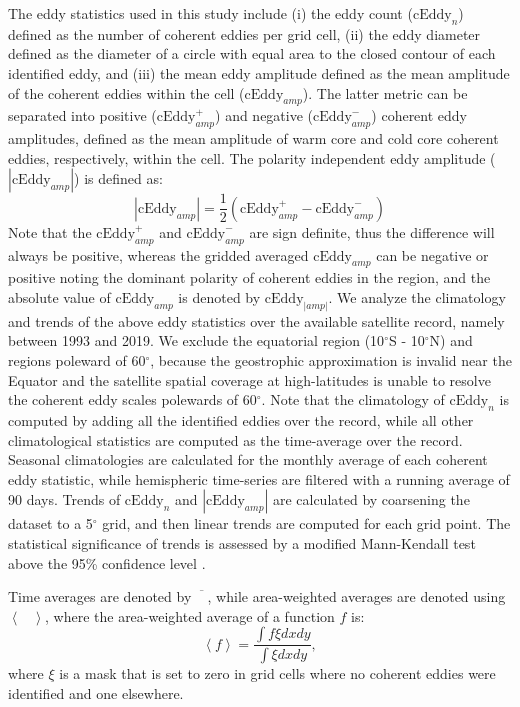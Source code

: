 \documentclass[draft,linenumbers]{agujournal2019}
\begin{document}
	The eddy statistics used in this study include (i) the eddy count ($\mathrm{cEddy}_{n}$) defined as the number of coherent eddies per grid cell, (ii) the eddy diameter defined as the diameter of a circle with equal area to the closed contour of each identified eddy, and (iii) the mean eddy amplitude defined as the mean amplitude of the coherent eddies within the cell ($\mathrm{cEddy}_{amp}$). The latter metric can be separated into positive ($\mathrm{cEddy}_{amp}^{+}$) and negative ($\mathrm{cEddy}_{amp}^{-}$) coherent eddy amplitudes, defined as the mean amplitude of warm core and cold core coherent eddies, respectively, within the cell. 
	The polarity independent eddy amplitude ($|\mathrm{cEddy}_{amp}|$) is defined as:
	\begin{equation}
	|\mathrm{cEddy}_{amp}| = \frac{1}{2} \left(\mathrm{cEddy}_{amp}^{+} -  \mathrm{cEddy}_{amp}^{-} \right)
	\end{equation}
	Note that the $\mathrm{cEddy}_{amp}^{+}$ and $\mathrm{cEddy}_{amp}^{-}$ are sign definite, thus the difference will always be positive, whereas the gridded averaged $\mathrm{cEddy}_{amp}$ can be negative or positive noting the dominant polarity of coherent eddies in the region, and the absolute value of $\mathrm{cEddy}_{amp}$ is denoted by $\mathrm{cEddy}_{|amp|}$.
	We analyze the climatology and trends of the above eddy statistics over the available satellite record, namely between 1993 and 2019. 
	We exclude the equatorial region (10$^\circ$S - 10$^\circ$N) and regions poleward of 60$^\circ$, because the geostrophic approximation is invalid near the Equator and the satellite spatial coverage at high-latitudes is unable to resolve the coherent eddy scales polewards of 60$^\circ$.
	Note that the climatology of $\mathrm{cEddy}_{n}$ is computed by adding all the identified eddies over the record, while all other climatological statistics are computed as the time-average over the record.  
	Seasonal climatologies are calculated for the monthly average of each coherent eddy statistic, while hemispheric time-series are filtered with a running average of 90 days. 
	Trends of $\mathrm{cEddy}_{n}$ and $|\mathrm{cEddy}_{amp}|$ are calculated by coarsening the dataset to a 5$^\circ$ grid, and then linear trends are computed for each grid point. The statistical significance of trends is assessed by a modified Mann-Kendall test above the 95\% confidence level \citep{Sheng_MK_2004}. 

	Time averages are denoted by $\overline{\phantom{X}}$, while area-weighted averages are denoted using $\left< \phantom{X}\right>$, where the area-weighted average of a function $f$ is:
	\begin{equation}
		\left< f \right>  = \frac{\int f \xi dx dy}{\int \xi dx dy},
	\end{equation}
	where $\xi$ is a mask that is set to zero in grid cells where no coherent eddies were identified and one elsewhere. 
\end{document}

